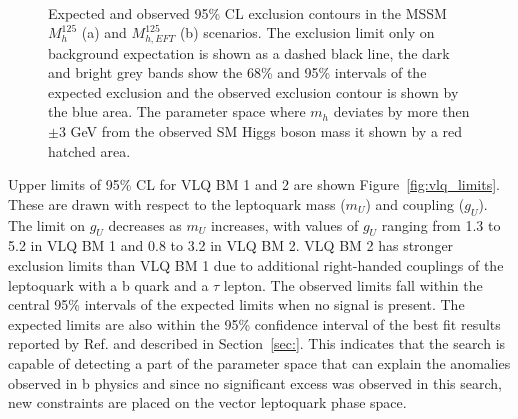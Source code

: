 \begin{figure}[!hbtp]
\centering
     \\
\caption{Expected and observed 95\% CL exclusion contours in the MSSM $M_{h}^{125}$ (a) and $M_{h,EFT}^{125}$ (b) scenarios. The exclusion limit only on background expectation is shown as a dashed black line, the dark and bright grey bands show the 68\% and 95\% intervals of the expected exclusion and the observed exclusion contour is shown by the blue area. The parameter space where $m_{h}$ deviates by more then $\pm$3  GeV from the observed SM Higgs boson mass it shown by a red hatched area.
}
\label{fig:mssm_limits}
\end{figure}

Upper limits of 95\% CL for VLQ BM 1 and 2 are shown Figure~\ref{fig:vlq_limits}. 
These are drawn with respect to the leptoquark mass ($m_{U}$) and coupling ($g_{U}$).
The limit on $g_{U}$ decreases as $m_{U}$ increases, with values of $g_U$ ranging from 1.3 to 5.2 in VLQ BM 1 and 0.8 to 3.2 in VLQ BM 2. 
VLQ BM 2 has stronger exclusion limits than VLQ BM 1 due to additional right-handed couplings of the leptoquark with a b quark and a $\tau$ lepton.
The observed limits fall within the central 95\% intervals of the expected limits when no signal is present. 
The expected limits are also within the 95\% confidence interval of the best fit results reported by Ref.\cite{Cornella:2021sby} and described in Section~\ref{sec:}.
This indicates that the search is capable of detecting a part of the parameter space that can explain the anomalies observed in b physics and since no significant excess was observed in this search, new constraints are placed on the vector leptoquark phase space. \\

